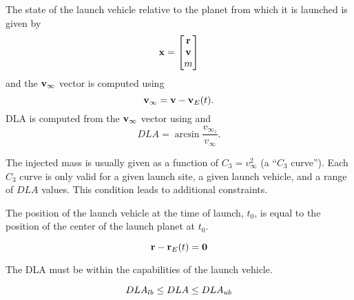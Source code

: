 The state of the launch vehicle relative to the planet from which it is launched is given by
%
\begin{equation}
   \mathbf{x}  =
 \begin{bmatrix}
    \mathbf{r}\\
    \mathbf{v}\\
    m\\
 \end{bmatrix}
\end{equation}
%
and the $\mathbf{v}_{\infty} $ vector is computed using
%
\begin{equation}
 \mathbf{v}_{\infty} = \mathbf{v} - \mathbf{v}_E(t).
\end{equation}
%
%
DLA  is computed from the $\mathbf{v}_{\infty}$ vector  using
%
%
and
%
\begin{equation}
    DLA = \arcsin{\frac{v_{\infty_z}}{v_{\infty}}}.
\end{equation}


The injected mass is usually given as a function of $C_3 = v_{\infty}^2$ (a ``$C_3$ curve''). Each $C_3$ curve is only valid for a given launch site, a given launch vehicle, and a range of $DLA$ values. This condition leads to additional constraints.

The position of the launch vehicle at the time of launch, $t_0$, is equal to the position of the center of the launch planet at $t_0$.

\begin{equation}
    \mathbf{r} - \mathbf{r}_E(t)= \bold{0} \\
 \end{equation}

\noindent The DLA must be within the capabilities of the launch vehicle.

\begin{equation}
    DLA_{lb} \le DLA \le DLA_{ub} \\
 \end{equation}

